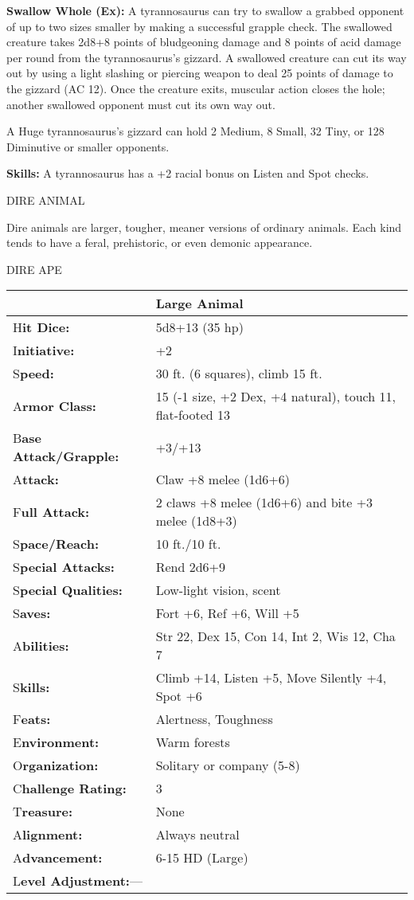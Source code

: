 \documentclass{article}
\begin{document}
\textbf{Swallow Whole (Ex): }A tyrannosaurus can try to swallow a grabbed opponent 
of up to two sizes smaller by making a successful grapple check. The swallowed 
creature takes 2d8+8 points of bludgeoning damage and 8 points of acid damage per 
round from the tyrannosaurus's gizzard. A swallowed creature can cut its way out 
by using a light slashing or piercing weapon to deal 25 points of damage to the 
gizzard (AC 12). Once the creature exits, muscular action closes the hole; another 
swallowed opponent must cut its own way out.

A Huge tyrannosaurus's gizzard can hold 2 Medium, 8 Small, 32 Tiny, or 128 Diminutive 
or smaller opponents.

\textbf{Skills: }A tyrannosaurus has a +2 racial bonus on Listen and Spot checks.

\vspace{12pt}
{\LARGE{}DIRE ANIMAL}

Dire animals are larger, tougher, meaner versions of ordinary animals. Each kind 
tends to have a feral, prehistoric, or even demonic appearance.

\vspace{12pt}
DIRE APE

\begin{tabular}{|>{\raggedright}p{91pt}|>{\raggedright}p{226pt}|}
\hline
  & Large Animal\tabularnewline
\hline
H\textbf{it Dice:} & 5d8+13 (35 hp)\tabularnewline
\hline
I\textbf{nitiative:} & +2\tabularnewline
\hline
S\textbf{peed:} & 30 ft. (6 squares), climb 15 ft.\tabularnewline
\hline
A\textbf{rmor Class:} & 15 (-1 size, +2 Dex, +4 natural), touch 11, flat-footed 
13\tabularnewline
\hline
B\textbf{ase Attack/Grapple:} & +3/+13\tabularnewline
\hline
A\textbf{ttack:} & Claw +8 melee (1d6+6)\tabularnewline
\hline
F\textbf{ull Attack:} & 2 claws +8 melee (1d6+6) and bite +3 melee (1d8+3)\tabularnewline
\hline
S\textbf{pace/Reach:} & 10 ft./10 ft.\tabularnewline
\hline
S\textbf{pecial Attacks:} & Rend 2d6+9\tabularnewline
\hline
S\textbf{pecial Qualities:} & Low-light vision, scent\tabularnewline
\hline
S\textbf{aves:} & Fort +6, Ref +6, Will +5\tabularnewline
\hline
A\textbf{bilities:} & Str 22, Dex 15, Con 14, Int 2, Wis 12, Cha 7\tabularnewline
\hline
S\textbf{kills:} & Climb +14, Listen +5, Move Silently +4, Spot +6\tabularnewline
\hline
F\textbf{eats:} & Alertness, Toughness\tabularnewline
\hline
E\textbf{nvironment:} & Warm forests\tabularnewline
\hline
O\textbf{rganization:} & Solitary or company (5-8)\tabularnewline
\hline
C\textbf{hallenge Rating:} & 3\tabularnewline
\hline
T\textbf{reasure:} & None\tabularnewline
\hline
A\textbf{lignment:} & Always neutral\tabularnewline
\hline
A\textbf{dvancement:} & 6-15 HD (Large)\tabularnewline
\hline
L\textbf{evel Adjustment:}--- & \tabularnewline
\hline
\end{tabular}
\end{document}
